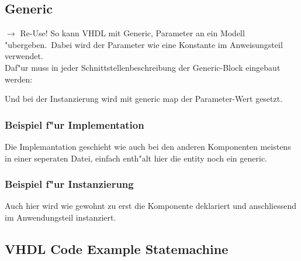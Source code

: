 	\subsection{Generic}
		$\rightarrow$ Re-Use! So kann VHDL mit Generic, Parameter an ein Modell 
		"ubergeben.\ Dabei wird der Parameter wie eine Konstante im Anweisungsteil 
		verwendet.\\
		Daf"ur muss in jeder Schnittstellenbeschreibung der Generic-Block eingebaut werden:
		
		Und bei der Instanzierung wird mit generic map der Parameter-Wert gesetzt.
		\begin{multicols}{2}
			\subsubsection{Beispiel f"ur Implementation}
				Die Implemantation geschieht wie auch bei den anderen 
				Komponenten meistens in einer seperaten Datei, einfach enth"alt hier die 
				entity noch ein generic.
				
			\subsubsection{Beispiel f"ur Instanzierung}
				Auch hier wird wie gewohnt zu erst die Komponente deklariert und 
				anschliessend im Anwendungsteil instanziert.
				
				
	\subsection{VHDL Code Example Statemachine}
		
		
		\end{multicols}
		
	
%
%		
%
%
%
%
